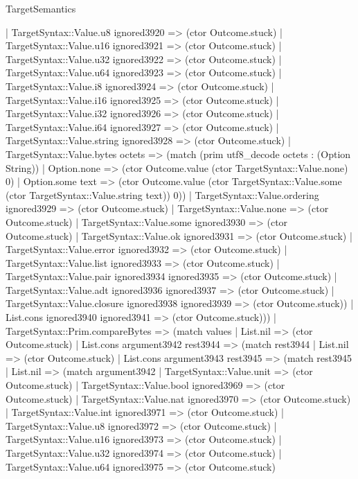 \begin{lexlean}{TargetSemantics}
\begin{semanticmodule}
{          | TargetSyntax::Value.u8 ignored3920 => (ctor Outcome.stuck)
          | TargetSyntax::Value.u16 ignored3921 => (ctor Outcome.stuck)
          | TargetSyntax::Value.u32 ignored3922 => (ctor Outcome.stuck)
          | TargetSyntax::Value.u64 ignored3923 => (ctor Outcome.stuck)
          | TargetSyntax::Value.i8 ignored3924 => (ctor Outcome.stuck)
          | TargetSyntax::Value.i16 ignored3925 => (ctor Outcome.stuck)
          | TargetSyntax::Value.i32 ignored3926 => (ctor Outcome.stuck)
          | TargetSyntax::Value.i64 ignored3927 => (ctor Outcome.stuck)
          | TargetSyntax::Value.string ignored3928 => (ctor Outcome.stuck)
          | TargetSyntax::Value.bytes octets => (match (prim utf8_decode octets : (Option String))
            | Option.none => (ctor Outcome.value (ctor TargetSyntax::Value.none) 0)
            | Option.some text => (ctor Outcome.value (ctor TargetSyntax::Value.some (ctor TargetSyntax::Value.string text)) 0))
          | TargetSyntax::Value.ordering ignored3929 => (ctor Outcome.stuck)
          | TargetSyntax::Value.none => (ctor Outcome.stuck)
          | TargetSyntax::Value.some ignored3930 => (ctor Outcome.stuck)
          | TargetSyntax::Value.ok ignored3931 => (ctor Outcome.stuck)
          | TargetSyntax::Value.error ignored3932 => (ctor Outcome.stuck)
          | TargetSyntax::Value.list ignored3933 => (ctor Outcome.stuck)
          | TargetSyntax::Value.pair ignored3934 ignored3935 => (ctor Outcome.stuck)
          | TargetSyntax::Value.adt ignored3936 ignored3937 => (ctor Outcome.stuck)
          | TargetSyntax::Value.closure ignored3938 ignored3939 => (ctor Outcome.stuck))
        | List.cons ignored3940 ignored3941 => (ctor Outcome.stuck)))
    | TargetSyntax::Prim.compareBytes => (match values
      | List.nil => (ctor Outcome.stuck)
      | List.cons argument3942 rest3944 => (match rest3944
        | List.nil => (ctor Outcome.stuck)
        | List.cons argument3943 rest3945 => (match rest3945
          | List.nil => (match argument3942
            | TargetSyntax::Value.unit => (ctor Outcome.stuck)
            | TargetSyntax::Value.bool ignored3969 => (ctor Outcome.stuck)
            | TargetSyntax::Value.nat ignored3970 => (ctor Outcome.stuck)
            | TargetSyntax::Value.int ignored3971 => (ctor Outcome.stuck)
            | TargetSyntax::Value.u8 ignored3972 => (ctor Outcome.stuck)
            | TargetSyntax::Value.u16 ignored3973 => (ctor Outcome.stuck)
            | TargetSyntax::Value.u32 ignored3974 => (ctor Outcome.stuck)
            | TargetSyntax::Value.u64 ignored3975 => (ctor Outcome.stuck)
}
\end{semanticmodule}
\end{lexlean}

